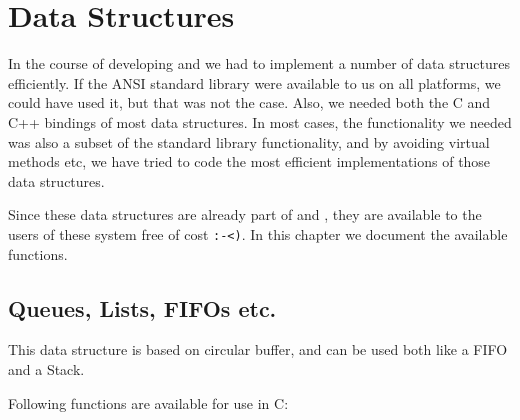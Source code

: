\chapter{Data Structures}

In the course of developing \converse{} and \charmpp{} we had to
implement a number of data structures efficiently. If the ANSI
standard \CC{} library were available to us on all platforms, we could
have used it, but that was not the case. Also, we needed both the C and C++
bindings of most data structures. In most cases, the functionality we needed
was also a subset of the \CC{} standard library functionality, and by
avoiding virtual methods etc, we have tried to code the most efficient
implementations of those data structures.

Since these data structures are already part of \converse{} and \charmpp{},
they are available to the users of these system free of cost \verb+:-<)+.
In this chapter we document the available functions.

\section{Queues, Lists, FIFOs etc.}

This data structure is based on circular buffer, and can be used both like
a FIFO and a Stack.

Following functions are available for use in C:








